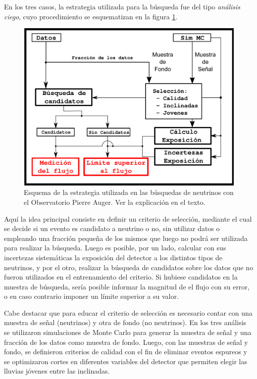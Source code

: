 En los tres casos, la estrategia utilizada para la búsqueda fue del tipo \emph{análisis ciego}, cuyo procedimiento se esquematizan en la figura \ref{fig:strAuger}.
%
\begin{figure}[ht!]
	\centering
	\includegraphics[width=\textwidth]{./fig/estrategiaAuger/analysisSchema}
	\caption{\label{fig:strAuger}
	Esquema de la estrategia utilizada en las búsquedas de neutrinos con el Observatorio Pierre Auger. Ver la explicación en el texto.
	}
\end{figure}
%
Aqu\'i la idea principal consiste en definir un criterio de selección, mediante el cual se decide si un evento es candidato a neutrino o no, sin utilizar datos o empleando una fracción peque\~na de los mismos que luego no podrá ser utilizada para realizar la búsqueda.
Luego es posible, por un lado, calcular con sus incertezas sistemáticas la exposición del detector a los distintos tipos de neutrinos, y por el otro, realizar la búsqueda de candidatos sobre los datos que no fueron utilizados en el entrenamiento del criterio.
Si hubiese candidatos en la muestra de b\'usqueda, sería posible informar la magnitud de el flujo con su error, o en caso contrario imponer un l\'imite superior a su valor.

Cabe destacar que para educar el criterio de selección es necesario contar con una muestra de señal (neutrinos) y otra de fondo (no neutrinos).
En los tres análisis se utilizaron simulaciones de Monte Carlo para generar la muestra de señal y una fracción de los datos como muestra de fondo.
Luego, con las muestras de señal y fondo, se definieron criterios de calidad con el fin de eliminar eventos espureos y se optimizaron cortes en diferentes variables del detector que permiten elegir las lluvias jóvenes entre las inclinadas. 

